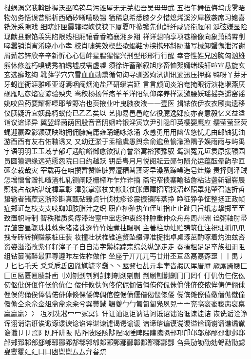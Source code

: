 挝蜗涡窝我斡卧握沃巫呜钨乌污诬屋⽆无芜梧吾吴⽏毋武
五捂午舞伍侮坞戊雾晤物勿务悟误昔熙析西硒矽晰嘻吸锡
牺稀息希悉膝⼣夕惜熄烯溪汐犀檄袭席习媳喜铣洗系隙戏
细瞎虾匣霞辖暇峡侠狭下厦夏吓掀锨先仙鲜纤咸贤衔舷闲
涎弦嫌显险现献县腺馅羡宪陷限线相厢镶⾹香箱襄湘乡翔
祥详想响享项巷橡像向象萧硝霄削哮嚣销消宵淆晓⼩小孝
校肖啸笑效楔些歇蝎鞋协挟携邪斜胁谐写械卸蟹懈泄泻谢
屑薪芯锌欣⾟辛新忻⼼心信衅星腥猩惺兴刑型形邢⾏行醒
幸杏性姓兄凶胸匈汹雄熊休修羞朽嗅锈秀袖绣墟戌需虚嘘
须徐许蓄酗叙旭序畜恤絮婿绪续轩喧宣悬旋⽞玄选癣眩绚
靴薛学⽳穴雪⾎血勋熏循旬询寻驯巡殉汛训讯逊迅压押鸦
鸭呀丫芽⽛牙蚜崖衙涯雅哑亚讶焉咽阉烟淹盐严研蜒岩延
⾔言颜阎炎沿奄掩眼衍演艳堰燕厌砚雁唁彦焰宴谚验殃央
鸯秧杨扬佯疡⽺羊洋阳氧仰痒养样漾邀腰妖瑶摇尧遥窑谣
姚咬舀药要耀椰噎耶爷野冶也页掖业叶曳腋夜液⼀一壹医
揖铱依伊⾐衣颐夷遗移仪胰疑沂宜姨彝椅蚁倚已⼄乙矣以
艺抑易⾢邑屹亿役臆逸肄疫亦裔意毅忆义益溢诣议谊译异
翼翌绎茵荫因殷⾳音阴姻吟银淫寅饮尹引隐印英樱婴鹰应
缨莹萤营荧蝇迎赢盈影颖硬映哟拥佣臃痈庸雍踊蛹咏泳涌
永恿勇⽤用幽优悠忧尤由邮铀犹油游⾣酉有友右佑釉诱⼜
又幼迂淤于盂榆虞愚舆余俞逾鱼愉渝渔隅予娱⾬雨与屿禹
宇语⽻羽⽟玉域芋郁吁遇喻峪御愈欲狱育誉浴寓裕预豫驭
鸳渊冤元垣袁原援辕园员圆猿源缘远苑愿怨院⽈曰约越跃
钥岳粤⽉月悦阅耘云郧匀陨允运蕴酝晕韵孕匝砸杂栽哉灾
宰载再在咱攒暂赞赃脏葬遭糟凿藻枣早澡蚤躁噪造皂灶燥
责择则泽贼怎增憎曾赠扎喳渣札轧铡闸眨栅榨咋乍炸诈摘
斋宅窄债寨瞻毡詹粘沾盏斩辗崭展蘸栈占战站湛绽樟章彰
漳张掌涨杖丈帐账仗胀瘴障招昭找沼赵照罩兆肇召遮折哲
蛰辙者锗蔗这浙珍斟真甄砧臻贞针侦枕疹诊震振镇阵蒸挣
睁征狰争怔整拯正政帧症郑证芝枝⽀支吱蜘知肢脂汁之织
职直植殖执值侄址指⽌止趾只旨纸志挚掷⾄至致置帜峙制
智秩稚质炙痔滞治窒中盅忠钟衷终种肿重仲众⾈舟周州洲
诌粥轴肘帚咒皱宙昼骤珠株蛛朱猪诸诛逐⽵竹烛煮拄瞩嘱
主著柱助蛀贮铸筑住注祝驻抓⽖爪拽专砖转撰赚篆桩庄装
妆撞壮状椎锥追赘坠缀谆准捉拙卓桌琢茁酌啄着灼浊兹咨
资姿滋淄孜紫仔籽滓⼦子⾃自渍字鬃棕踪宗综总纵邹⾛走
奏揍租⾜足卒族祖诅阻组钻纂嘴醉最罪尊遵昨左佐柞做作
坐座亍丌兀兀丐廿卅丕亘丞⿀鬲孬噩⼁丨禺⼃丿⼔匕乇夭
⽘爻卮氐囟胤馗毓睾鼗⼂丶亟鼐乜乩亓芈孛啬嘏仄厍厝厣
厥厮靥赝⼕匚叵匦匮匾赜卦卣刂刈刎刭刳刿剀剌剞剡剜蒯
剽劂劁劐劓⼌冂罔亻仃仉仂仨仡仫仞伛仳伢佤仵伥伧伉伫
佞佧攸佚佝佟佗伲伽佶佴侑侉侃侏佾佻侪佼侬侔俦俨俪俅
俚俣俜俑俟俸倩偌俳倬倏倮倭俾倜倌倥倨偾偃偕偈偎偬偻
傥傧傩傺僖儆僭僬僦僮儇儋仝氽佘佥俎⿕龠汆籴兮巽黉馘
冁夔⼓勹匍訇匐凫夙兕⼇亠兖亳衮袤亵脔裒禀嬴蠃羸⼎冫
冱冽冼凇⼍冖冢冥讠讦讧讪讴讵讷诂诃诋诏诎诒诓诔诖诘
诙诜诟诠诤诨诩诮诰诳诶诹诼诿谀谂谄谇谌谏谑谒谔谕谖
谙谛谘谝谟谠谡谥谧谪谫谮谯谲谳谵谶⼙卩卺阝阢阡阱阪
阽阼陂陉陔陟陧陬陲陴隈隍隗隰邗邛邝邙邬邡邴邳邶邺邸
邰郏郅邾郐郄郇郓郦郢郜郗郛郫郯郾鄄鄢鄞鄣鄱鄯鄹酃酆
刍奂劢劬劭劾哿勐勖勰叟燮矍⼵廴⼐凵凼⾿鬯⼛厶弁畚巯
